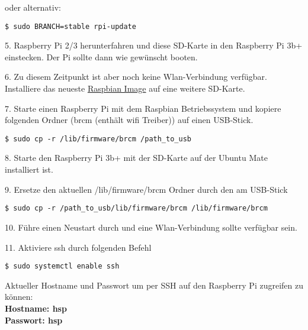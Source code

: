 oder alternativ:\\

\begin{lstlisting}
$ sudo BRANCH=stable rpi-update
\end{lstlisting}
\vspace{-0.8cm}

5. Raspberry Pi 2/3 herunterfahren und diese SD-Karte in den Raspberry Pi 3b+ einstecken. Der Pi sollte dann wie gewünscht booten. 

6. Zu diesem Zeitpunkt ist aber noch keine Wlan-Verbindung verfügbar. Installiere das neueste \href{https://www.raspberrypi.org/downloads/raspbian/}{Raspbian Image} auf eine weitere SD-Karte. 

7. Starte einen Raspberry Pi mit dem Raspbian Betriebssystem und kopiere folgenden Ordner (brcm (enthält wifi Treiber)) auf einen USB-Stick.\\

\begin{lstlisting}
$ sudo cp -r /lib/firmware/brcm /path_to_usb
\end{lstlisting}
\vspace{-0.8cm}

8. Starte den Raspberry Pi 3b+ mit der SD-Karte auf der Ubuntu Mate installiert ist. 

9. Ersetze den aktuellen /lib/firmware/brcm Ordner durch den am USB-Stick\\

\begin{lstlisting}
$ sudo cp -r /path_to_usb/lib/firmware/brcm /lib/firmware/brcm
\end{lstlisting}
\vspace{-0.8cm}

10. Führe einen Neustart durch und eine Wlan-Verbindung sollte verfügbar sein.

11. Aktiviere ssh durch folgenden Befehl\\

\begin{lstlisting}
$ sudo systemctl enable ssh
\end{lstlisting}


Aktueller Hostname und Passwort um per SSH auf den Raspberry Pi zugreifen zu können:\\
\textbf{Hostname: hsp}\\
\textbf{Passwort: hsp}







